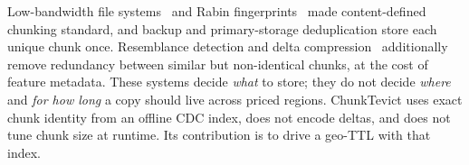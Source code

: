 Low-bandwidth file systems~\cite{lbfs2001} and Rabin fingerprints~\cite{rabin1981} made content-defined chunking standard, and backup and primary-storage deduplication store each unique chunk once.
Resemblance detection and delta compression~\cite{zhang2019finesse,xia2016dare,ye2021fast} additionally remove redundancy between similar but non-identical chunks, at the cost of feature metadata.
These systems decide \emph{what} to store; they do not decide \emph{where} and \emph{for how long} a copy should live across priced regions.
ChunkTevict uses exact chunk identity from an offline {CDC} index, does not encode deltas, and does not tune chunk size at runtime.
Its contribution is to drive a geo-{TTL} with that index.
